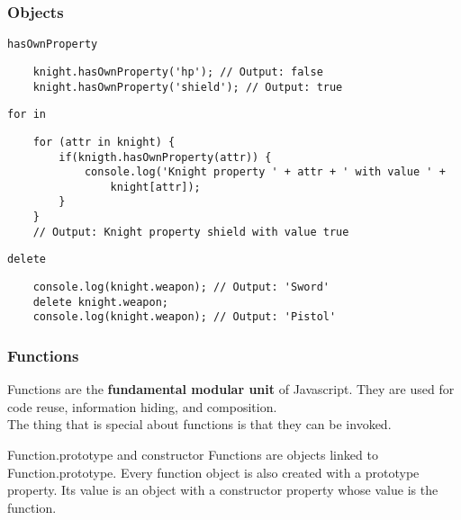 \begin{frame}[fragile]
  \frametitle{Objects}
  \begin{block}{\texttt{hasOwnProperty}}
    {\scriptsize
    \begin{verbatim}
    knight.hasOwnProperty('hp'); // Output: false
    knight.hasOwnProperty('shield'); // Output: true
    \end{verbatim}
    }
  \end{block}

  \pause

  \begin{block}{\texttt{for in}}
    {\scriptsize
    \begin{verbatim}
    for (attr in knight) {
        if(knigth.hasOwnProperty(attr)) {
            console.log('Knight property ' + attr + ' with value ' + 
                knight[attr]);  
        }
    }
    // Output: Knight property shield with value true
    \end{verbatim}
    }
  \end{block}
  
  \pause

  \begin{block}{\texttt{delete}}
    {\scriptsize
    \begin{verbatim}
    console.log(knight.weapon); // Output: 'Sword'
    delete knight.weapon;
    console.log(knight.weapon); // Output: 'Pistol'
    \end{verbatim}
    }
  \end{block}
\end{frame}

\begin{frame}[fragile]
  \frametitle{Functions}

  Functions are the \textbf{fundamental modular unit} of Javascript. They are used for code reuse, information hiding, and composition. \\

  The thing that is special about functions is that they can be invoked.
  \pause

  \begin{block}{Function.prototype and constructor}
  Functions are objects linked to Function.prototype. Every function object is also created with a prototype property. Its value is an object with a constructor property whose value is the function.
  \end{block}

  \pause
\end{frame}

